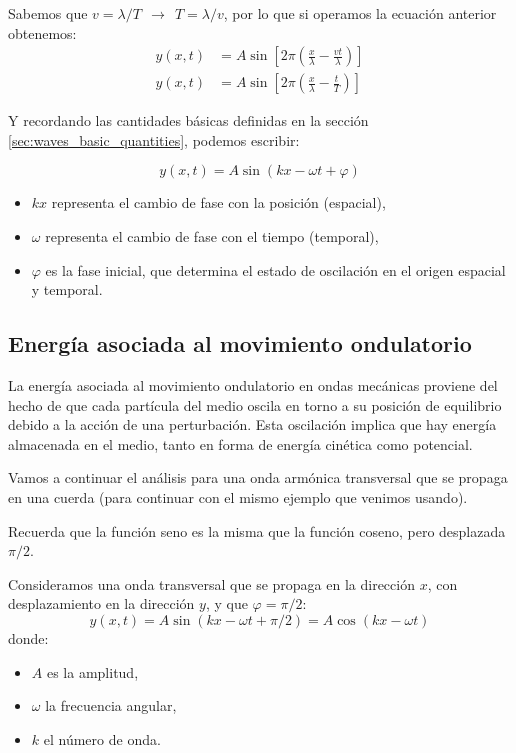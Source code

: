 Sabemos que \(v = \lambda / T ~~ \rightarrow ~~ T = \lambda/v\), por lo que si operamos la ecuación anterior obtenemos:
\begin{align*}
  y(x, t) & = A \sin\left[2\pi \left(\frac{x}{\lambda} - \frac{vt}{\lambda} \right)\right] \\
  y(x, t) & = A \sin\left[2\pi \left(\frac{x}{\lambda} - \frac{t}{T} \right)\right]
\end{align*}

Y recordando las cantidades básicas definidas en la sección \ref{sec:waves_basic_quantities}, podemos escribir:

\begin{equation}
  \boxed{y(x,t) = A \sin(kx - \omega t + \varphi)}
\end{equation}
\begin{itemize}
  \item \(kx\) representa el cambio de fase con la posición (espacial),
  \item \(\omega\) representa el cambio de fase con el tiempo (temporal),
  \item \(\varphi\) es la fase inicial, que determina el estado de oscilación en el origen espacial y temporal.
\end{itemize}

\subsection{Energía asociada al movimiento ondulatorio}

La energía asociada al movimiento ondulatorio en ondas mecánicas proviene del hecho de que cada partícula del medio oscila en torno a su posición de equilibrio debido a la acción de una perturbación. Esta oscilación implica que hay energía almacenada en el medio, tanto en forma de energía cinética como potencial.

Vamos a continuar el análisis para una onda armónica transversal que se propaga en una cuerda (para continuar con el mismo ejemplo que venimos usando). 

\begin{tcolorbox}[myconclusion]
  Recuerda que la función seno es la misma que la función coseno, pero desplazada \(\pi/2\).
\end{tcolorbox}

Consideramos una onda transversal que se propaga en la dirección \(x\), con desplazamiento en la dirección \(y\), y que \(\varphi = \pi/2\):
\[
y(x,t) = A \sin(kx - \omega t + \pi/2) = \boxed{A \cos(kx - \omega t)}
\]
donde:
\begin{itemize}
  \item \(A\) es la amplitud,
  \item \(\omega\) la frecuencia angular,
  \item \(k\) el número de onda.
\end{itemize}

